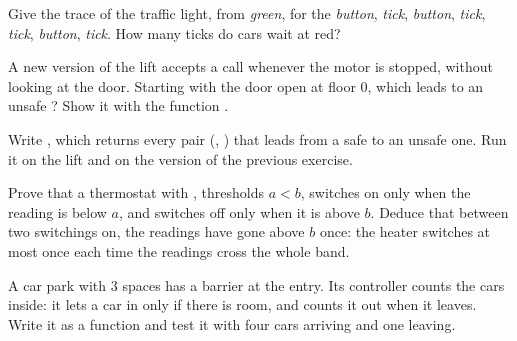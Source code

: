 \begin{exercise}[$\star\star$]\label{exo:g10:sensors-actuators-control:9}
Give the trace of the traffic light, from \textit{green}, for the  \textit{button}, \textit{tick},
\textit{button}, \textit{tick}, \textit{tick}, \textit{button}, \textit{tick}. How many ticks do cars wait at red?
\end{exercise}

\begin{exercise}[$\star\star$]\label{exo:g10:sensors-actuators-control:10}
A new version of the lift accepts a call whenever the motor is stopped, without looking at the door. Starting with
the door open at floor $0$, which  leads to an unsafe ? Show it with the function .
\end{exercise}

\begin{exercise}[$\star\star$]\label{exo:g10:sensors-actuators-control:11}
Write , which returns every pair (, ) that leads from a safe
 to an unsafe one. Run it on the lift and on the version of the previous exercise.
\end{exercise}

\begin{exercise}[$\star\star\star$]\label{exo:g10:sensors-actuators-control:12}
Prove that a thermostat with , thresholds $a < b$, switches on only when the reading is below $a$, and
switches off only when it is above $b$. Deduce that between two switchings on, the readings have gone above $b$
once: the heater switches at most once each time the readings cross the whole band.
\end{exercise}

\begin{exercise}[$\star\star\star$]\label{exo:g10:sensors-actuators-control:13}
A car park with $3$ spaces has a barrier at the entry. Its controller counts the cars inside: it lets a car in only
if there is room, and counts it out when it leaves. Write it as a function  and test it
with four cars arriving and one leaving.
\end{exercise}

